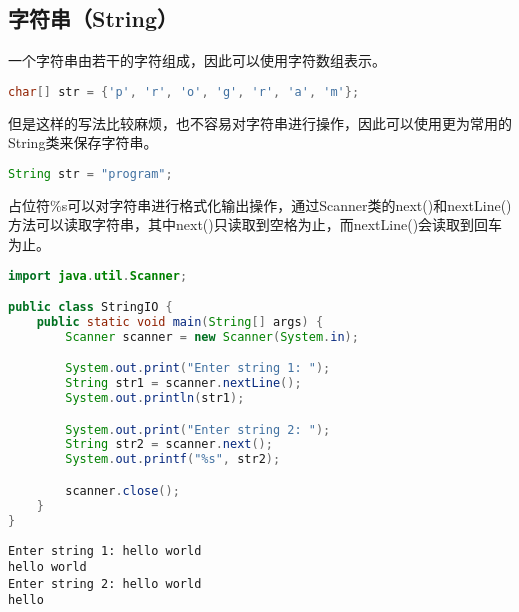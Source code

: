 \subsection{字符串（String）}

一个字符串由若干的字符组成，因此可以使用字符数组表示。

\vspace{-0.5cm}

\begin{lstlisting}[language=Java]
char[] str = {'p', 'r', 'o', 'g', 'r', 'a', 'm'};
\end{lstlisting}

但是这样的写法比较麻烦，也不容易对字符串进行操作，因此可以使用更为常用的String类来保存字符串。

\vspace{-0.5cm}

\begin{lstlisting}[language=Java]
String str = "program";
\end{lstlisting}

占位符\%s可以对字符串进行格式化输出操作，通过Scanner类的next()和nextLine()方法可以读取字符串，其中next()只读取到空格为止，而nextLine()会读取到回车为止。\\


\begin{lstlisting}[language=Java]
import java.util.Scanner;

public class StringIO {
	public static void main(String[] args) {
		Scanner scanner = new Scanner(System.in);

		System.out.print("Enter string 1: ");
		String str1 = scanner.nextLine();
		System.out.println(str1);

		System.out.print("Enter string 2: ");
		String str2 = scanner.next();
		System.out.printf("%s", str2);

		scanner.close();
	}
}
\end{lstlisting}

\begin{tcolorbox}
	\begin{verbatim}
Enter string 1: hello world
hello world
Enter string 2: hello world
hello
	\end{verbatim}
\end{tcolorbox}

\vspace{0.5cm}


